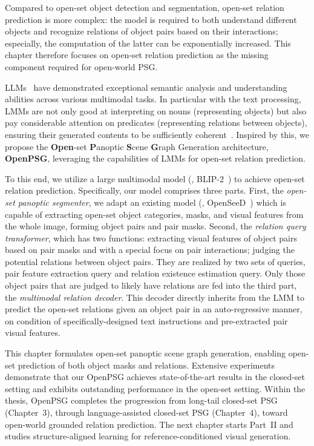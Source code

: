 Compared to open-set object detection and segmentation, open-set relation prediction is more complex: 
the model is required to both understand different objects and  recognize relations of object pairs based on their interactions; especially,  the computation of the latter can be exponentially increased.  
This chapter therefore focuses on open-set relation prediction as the missing component required for open-world PSG. 

LLMs~\citep{li2023blip, liu2024visual, zhu2023minigpt} have demonstrated exceptional semantic analysis and understanding abilities across various multimodal tasks.
In particular with the text processing, LMMs are not only good at interpreting on nouns (\ie  representing objects) but also pay considerable attention on predicates (\ie representing relations between objects), ensuring their generated contents to be sufficiently coherent~\citep{achiam2023gpt}.
Inspired by this, we propose the \textbf{Open}-set \textbf{P}anoptic \textbf{S}cene \textbf{G}raph Generation architecture, \textbf{OpenPSG}, leveraging the capabilities of LMMs for open-set relation prediction.

To this end, we utilize a large multimodal model (\eg, BLIP-2~\citep{li2023blip}) to achieve open-set relation prediction.
Specifically, our model comprises three parts.
First, the \textit{open-set panoptic segmenter}, we adapt an existing model (\eg, OpenSeeD~\citep{zhang2023simple}) which is capable of extracting open-set object categories, masks, and visual features from the whole image, forming object pairs and pair masks.
Second, the \textit{relation query transformer}, which has two functions: extracting visual features of object pairs based on pair masks and with a special focus on pair interactions; judging the potential relations between object pairs.
They are realized by two sets of queries, pair feature extraction query and relation existence estimation query.
Only those object pairs that are judged to likely have relations are fed into the third part, the \textit{multimodal relation decoder}.
This decoder directly inherits from the LMM to predict the open-set relations given an object pair in an auto-regressive manner, on condition of specifically-designed text instructions and pre-extracted pair visual features.

This chapter formulates open-set panoptic scene graph generation, enabling open-set prediction of both object masks and relations.
Extensive experiments demonstrate that our OpenPSG achieves state-of-the-art results in the closed-set setting and exhibits outstanding performance in the open-set setting.
Within the thesis, OpenPSG completes the progression from long-tail closed-set PSG (Chapter~3), through language-assisted closed-set PSG (Chapter~4), toward open-world grounded relation prediction.
The next chapter starts Part~II and studies structure-aligned learning for reference-conditioned visual generation.
